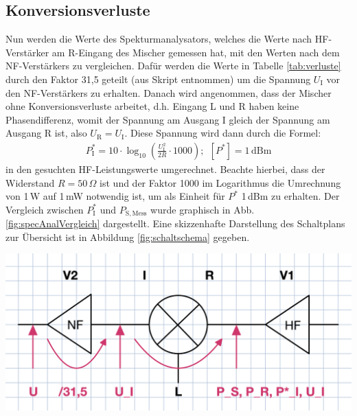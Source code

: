 \subsection{Konversionsverluste}
\label{sub:konversionsverluste}

Nun werden die Werte des Spekturmanalysators, welches die Werte nach HF-Verstärker am R-Eingang des Mischer gemessen hat, mit den Werten nach dem NF-Verstärkers zu vergleichen. Dafür werden die Werte in Tabelle \ref{tab:verluste} durch den Faktor 31,5 geteilt (aus Skript entnommen) um die Spannung $U_\mathrm{I}$ vor den NF-Verstärkers zu erhalten. Danach wird angenommen, dass der Mischer ohne Konversionsverluste arbeitet, d.h. Eingang L und R haben keine Phasendifferenz, womit der Spannung am Ausgang I gleich der Spannung am Ausgang R ist, also $U_\mathrm{R} = U_\mathrm{I}$. Diese Spannung wird dann durch die Formel:
\begin{gather}
    P^*_\mathrm{I} = 10\cdot\log_{10}\left(\frac{U_\mathrm{I}^2}{2R}\cdot1000\right);~~[P^*] = 1\,\mathrm{dBm}
\end{gather}
in den gesuchten HF-Leistungswerte umgerechnet. \cite{anleitung} Beachte hierbei, dass der Widerstand $R=50\,\Omega$ \cite{anleitung} ist und der Faktor 1000 im Logarithmus die Umrechnung von 1\,W auf 1\,mW notwendig ist, um als Einheit für $P^*$ 1\,dBm zu erhalten. Der Vergleich zwischen $P^*_\mathrm{I}$ und $P_\mathrm{S,Mess}$ wurde graphisch in Abb. \ref{fig:specAnalVergleich} dargestellt. Eine skizzenhafte Darstellung des Schaltplans zur Übersicht ist in Abbildung \ref{fig:schaltschema} gegeben. 

\begin{center}
    \captionsetup{type=figure}
    \includegraphics[scale=0.2]{Bilder/Schaltschema.png}
    \label{fig:schaltschema}
\end{center}

